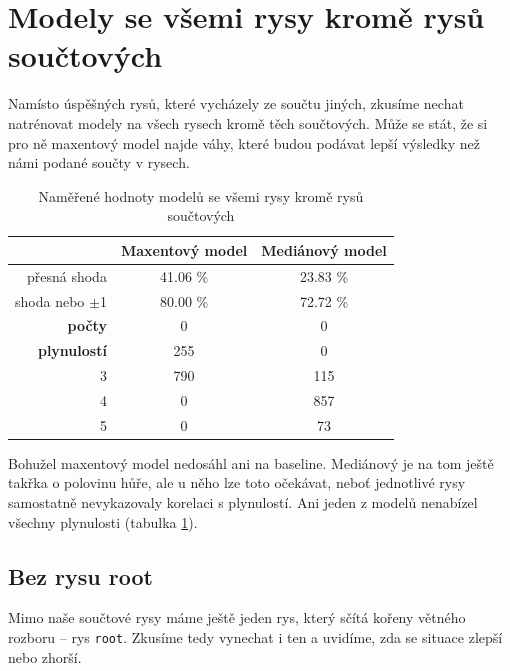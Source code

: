 \documentclass[12pt,a4paper]{report}
\begin{document}
\section{Modely se všemi rysy kromě rysů součtových}
Namísto úspěšných rysů, které vycházely ze součtu jiných, zkusíme nechat natrénovat modely na všech rysech kromě těch součtových. Může se stát, že si pro ně maxentový model najde váhy, které budou podávat lepší výsledky než námi podané součty v rysech.

\begin{table}[!htbp]
\begin{center}
\begin{tabular}{|r|c|c|}
\hline
 & \textbf{Maxentový model} & \textbf{Mediánový model} \\
 \hline
přesná shoda & 41.06 \%  & 23.83 \%  \\
\hline
shoda nebo $\pm$1 & 80.00 \% & 72.72 \%  \\
\hline
     \textbf{počty} \quad 1 & \color{red}0   & \color{red}0   \\
\textbf{plynulostí} \quad 2 & 255 & \color{red}0   \\
                          3 & 790 & 115 \\
                          4 & \color{red}0   & 857 \\
                          5 & \color{red}0   & 73  \\
\hline
\end{tabular}
\caption{Naměřené hodnoty modelů se všemi rysy kromě rysů součtových}\label{tb:woutsums}
\end{center}
\end{table}

Bohužel maxentový model nedosáhl ani na baseline. Mediánový je na tom ještě takřka o polovinu hůře, ale u něho lze toto očekávat, neboť jednotlivé rysy samostatně nevykazovaly korelaci s plynulostí. Ani jeden z modelů nenabízel všechny plynulosti (tabulka \ref{tb:woutsums}).

\subsection{Bez rysu root}
Mimo naše součtové rysy máme ještě jeden rys, který sčítá kořeny větného rozboru -- rys \texttt{root}. Zkusíme tedy vynechat i ten a uvidíme, zda se situace zlepší nebo zhorší.
\end{document}
